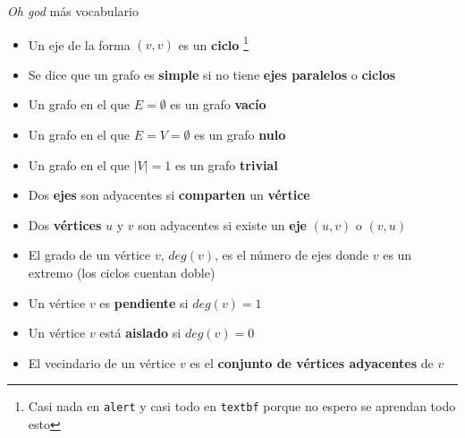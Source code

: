 \documentclass[spanish, c]{beamer}
\newcommand\blfootnote[1]{%
\begingroup
\renewcommand\thefootnote{}\footnote{#1}%
\addtocounter{footnote}{-1}%
\endgroup
}
\begin{document}
\begin{frame}{\textit{Oh god} más vocabulario}
\begin{itemize}[<+->]
    \item Un eje de la forma $(v, v)$ es un \textbf{ciclo}\blfootnote{\tiny Casi nada en \texttt{alert} y casi todo en \texttt{textbf} porque no espero se aprendan todo esto}
    \item Se dice que un grafo es \textbf{simple} si no tiene \textbf{ejes paralelos} o \textbf{ciclos}
    \item Un grafo en el que $E = \emptyset$ es un grafo \textbf{vacío}
    \item Un grafo en el que $E = V = \emptyset$ es un grafo \textbf{nulo}
    \item Un grafo en el que $\vert V \vert = 1$ es un grafo \textbf{trivial}
    \item Dos \textbf{ejes} son \alert{adyacentes} si \textbf{comparten} un \textbf{vértice}
    \item Dos \textbf{vértices} $u$ y $v$ son \alert{adyacentes} si existe un \textbf{eje} $(u,v)$ o $(v,u)$
    \item El \alert{grado} de un vértice $v$, $deg(v)$, es el número de ejes donde $v$ es un extremo (los ciclos cuentan doble)
    \item Un vértice $v$ es \textbf{pendiente} si $deg(v) = 1$
    \item Un vértice $v$ está \textbf{aislado} si $deg(v) = 0$
    \item El \alert{vecindario} de un vértice $v$ es el \textbf{conjunto de vértices adyacentes} de $v$
\end{itemize}
\end{frame}
\end{document}
